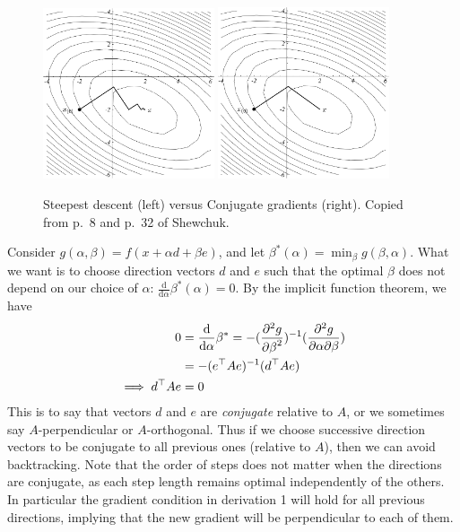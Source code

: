 \documentclass[11pt]{article}
\newcommand{\T}{\top}
\renewcommand{\(}{\left(}
\renewcommand{\)}{\right)}
\newcommand{\partbyby}[3]{{\partial^2 #1\over \partial #2 \partial #3}}
\newcommand{\partbyt}[2]{{\partial^2 #1\over {\partial #2}^2}}
\newcommand{\ud}{\mathrm{d}}
\newcommand{\dby}[2]{\frac{\ud #1}{\ud #2}}
\begin{document}
\begin{figure}[h]
\parbox{\textwidth}{
  \includegraphics[width=0.45\textwidth]{images/shewchuk-p-8.png}
  \hfill
  \includegraphics[width=0.45\textwidth]{images/shewchuk-p-32.png}
}
\caption{Steepest descent (left) versus Conjugate gradients (right).
  Copied from p.~8 and p.~32 of Shewchuk.}
\end{figure}

Consider $g(\alpha,\beta)=f(x+\alpha d + \beta e)$, and let
$\beta^*(\alpha)=\min_\beta g(\beta,\alpha)$. What we want is to
choose direction vectors $d$ and $e$ such that the optimal $\beta$
does not depend on our choice of $\alpha$:
$\dby{}{\alpha}\beta^*(\alpha) = 0$. By the implicit function theorem,
we have
\begin{align}
0 &= \dby{}{\alpha}\beta^* = -(\partbyt{g}{\beta})^{-1} (\partbyby{g}{\alpha}{\beta}) \\
&= -(e^\T A e)^{-1} (d^\T A e) \\
\implies d^\T A e &= 0
\end{align}
This is to say that vectors $d$ and $e$ are {\em conjugate} relative to $A$,
or we sometimes say $A$-perpendicular or $A$-orthogonal. Thus if we
choose successive direction vectors to be conjugate to all previous
ones (relative to $A$), then we can avoid backtracking. Note that the
order of steps does not matter when the directions are conjugate, as
each step length remains optimal independently of the others. In
particular the gradient condition in derivation 1 will hold for all
previous directions, implying that the new gradient will be
perpendicular to each of them.
\end{document}

